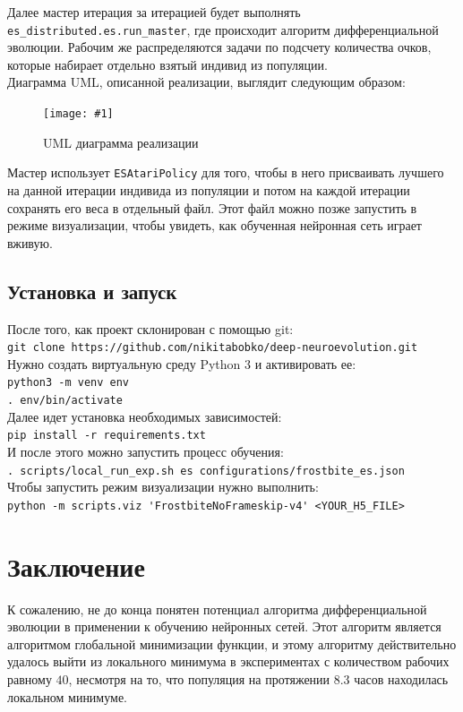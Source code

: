 \documentclass[12pt]{article}
\newcommand{\img}[3]{
    \begin{figure}[H]
        \centering
        \texttt{[image: \#1]}
        \caption{#3}
    \end{figure}
}
\begin{document}
    Далее мастер итерация за итерацией будет выполнять \verb!es_distributed.es.run_master!, где происходит алгоритм дифференциальной эволюции. Рабочим же распределяются задачи по подсчету количества очков, которые набирает отдельно взятый индивид из популяции. \\

    Диаграмма UML, описанной реализации, выглядит следующим образом:
    \img{uml.png}{0.8}{UML диаграмма реализации}

    Мастер использует \verb!ESAtariPolicy! для того, чтобы в него присваивать лучшего на данной итерации индивида из популяции и потом на каждой итерации сохранять его веса в отдельный файл. Этот файл можно позже запустить в режиме визуализации, чтобы увидеть, как обученная нейронная сеть играет вживую.

    \subsection{Установка и запуск}
    После того, как проект склонирован с помощью git: \\

    \verb!git clone https://github.com/nikitabobko/deep-neuroevolution.git! \\

    Нужно создать виртуальную среду Python 3 и активировать ее: \\

    \verb!python3 -m venv env! \\
    \verb!. env/bin/activate! \\

    Далее идет установка необходимых зависимостей: \\

    \verb!pip install -r requirements.txt! \\

    И после этого можно запустить процесс обучения: \\

    \verb!. scripts/local_run_exp.sh es configurations/frostbite_es.json! \\

    Чтобы запустить режим визуализации нужно выполнить: \\

    \verb!python -m scripts.viz 'FrostbiteNoFrameskip-v4' <YOUR_H5_FILE>!

\section{Заключение}
    К сожалению, не до конца понятен потенциал алгоритма дифференциальной эволюции в применении к обучению нейронных сетей. Этот алгоритм является алгоритмом глобальной минимизации функции, и этому алгоритму действительно удалось выйти из локального минимума в экспериментах с количеством рабочих равному $40$, несмотря на то, что популяция на протяжении 8.3 часов находилась локальном минимуме. \\
\end{document}
